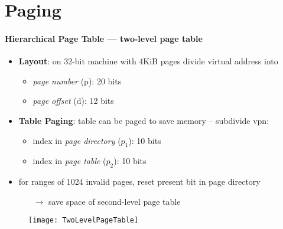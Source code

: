 \section{Paging}

\paragraph{Hierarchical Page Table --- two-level page table}
\begin{itemize}
  \item \textbf{Layout}: on 32-bit machine with 4KiB pages divide virtual address into
  \begin{itemize}
    \item \emph{page number} (p): 20 bits
    \item \emph{page offset} (d): 12 bits
  \end{itemize}
  \item \textbf{Table Paging}: table can be paged to save memory -- subdivide vpn:
  \begin{itemize}
    \item index in \emph{page directory} ($ p_1 $): 10 bits
    \item index in \emph{page table} ($ p_2 $): 10 bits
  \end{itemize}
  \item for ranges of 1024 invalid pages, reset present bit in page directory
  \begin{itemize}
    \item[$ \to $] save space of second-level page table
  \end{itemize}
\end{itemize}
\begin{figure}[h]\centering\label{TwoLevelPageTable}\texttt{[image: TwoLevelPageTable]}\end{figure}

